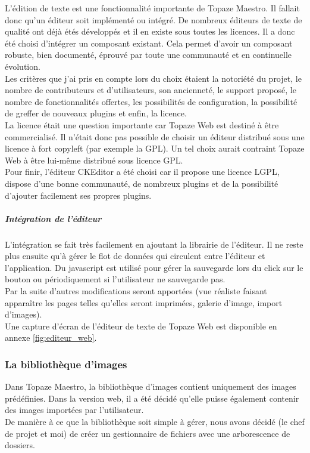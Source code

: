 L’édition de texte est une fonctionnalité importante de Topaze Maestro. Il fallait donc qu’un éditeur soit implémenté ou intégré. De nombreux éditeurs de texte de qualité ont déjà étés développés et il en existe sous toutes les licences. Il a donc été choisi d’intégrer un composant existant. Cela permet d’avoir un composant robuste, bien documenté, éprouvé par toute une communauté et en continuelle évolution.\\

Les critères que j’ai pris en compte lors du choix étaient la notoriété du projet, le nombre de contributeurs et d’utilisateurs, son ancienneté, le support proposé, le nombre de fonctionnalités offertes, les possibilités de configuration, la possibilité de greffer de nouveaux plugins et enfin, la licence.\\

La licence était une question importante car Topaze Web est destiné à être commercialisé. Il n’était donc pas possible de choisir un éditeur distribué sous une licence à fort copyleft (par exemple la GPL). Un tel choix aurait contraint Topaze Web à être lui-même distribué sous licence GPL.\\

Pour finir, l’éditeur CKEditor a été choisi car il propose une licence LGPL, dispose d’une bonne communauté, de nombreux plugins et de la possibilité d’ajouter facilement ses propres plugins.

\subparagraph*{Intégration de l’éditeur\\}
L’intégration se fait très facilement en ajoutant la librairie de l’éditeur. Il ne reste plus ensuite qu’à gérer le flot de données qui circulent entre l’éditeur et l’application. Du javascript est utilisé pour gérer la sauvegarde lors du click sur le bouton ou périodiquement si l’utilisateur ne sauvegarde pas.\\

Par la suite d’autres modifications seront apportées (vue réaliste faisant apparaître les pages telles qu’elles seront imprimées, galerie d’image, import d’images).\\

Une capture d'écran de l'éditeur de texte de Topaze Web est disponible en annexe \ref{fig:editeur_web}.

\subsubsection{La bibliothèque d'images}
Dans Topaze Maestro, la bibliothèque d'images contient uniquement des images prédéfinies. Dans la version web, il a été décidé qu'elle puisse également contenir des images importées par l'utilisateur.\\
De manière à ce que la bibliothèque soit simple à gérer, nous avons décidé (le chef de projet et moi) de créer un gestionnaire de fichiers avec une arborescence de dossiers.\\

